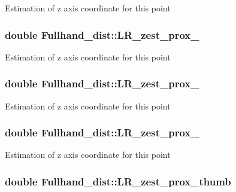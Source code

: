Estimation of z axis coordinate for this point \hypertarget{classFullhand__dist_a3dfe77521f71952b6e2a8a54df375ff9}{
\subsubsection[{LR\_\-zest\_\-prox\_\-2}]{\setlength{\rightskip}{0pt plus 5cm}double {\bf Fullhand\_\-dist::LR\_\-zest\_\-prox\_}}}
\label{classFullhand__dist_a3dfe77521f71952b6e2a8a54df375ff9}
Estimation of z axis coordinate for this point \hypertarget{classFullhand__dist_ab09c01d7f3d5d2b9272f0dca271c7ad2}{
\subsubsection[{LR\_\-zest\_\-prox\_\-3}]{\setlength{\rightskip}{0pt plus 5cm}double {\bf Fullhand\_\-dist::LR\_\-zest\_\-prox\_}}}
\label{classFullhand__dist_ab09c01d7f3d5d2b9272f0dca271c7ad2}
Estimation of z axis coordinate for this point \hypertarget{classFullhand__dist_aaf302c0685d4588af69b879056d28464}{
\subsubsection[{LR\_\-zest\_\-prox\_\-4}]{\setlength{\rightskip}{0pt plus 5cm}double {\bf Fullhand\_\-dist::LR\_\-zest\_\-prox\_}}}
\label{classFullhand__dist_aaf302c0685d4588af69b879056d28464}
Estimation of z axis coordinate for this point \hypertarget{classFullhand__dist_aedb43a4f22ba3b0aaa855e950767a4a9}{
\subsubsection[{LR\_\-zest\_\-prox\_\-thumb}]{\setlength{\rightskip}{0pt plus 5cm}double {\bf Fullhand\_\-dist::LR\_\-zest\_\-prox\_\-thumb}}}
\label{classFullhand__dist_aedb43a4f22ba3b0aaa855e950767a4a9}
